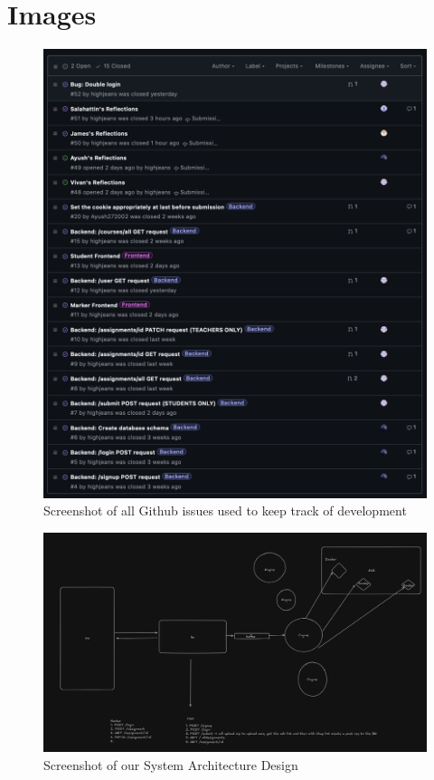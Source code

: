 \documentclass[a4paper, 12pt]{article}
\begin{document}
\section*{Images}
\begin{figure}[H]
    \centering
    \includegraphics[width = \textwidth]{Screenshot 2024-12-10 at 21.39.08.png}
    \caption{Screenshot of all Github issues used to keep track of development}
    \label{fig:issues}
\end{figure}
\begin{figure}[H]
    \centering
    \includegraphics[width = \textwidth]{System Architecture.png}
    \caption{Screenshot of our System Architecture Design}
    \label{fig:system-architecture}
\end{figure}
\end{document}
